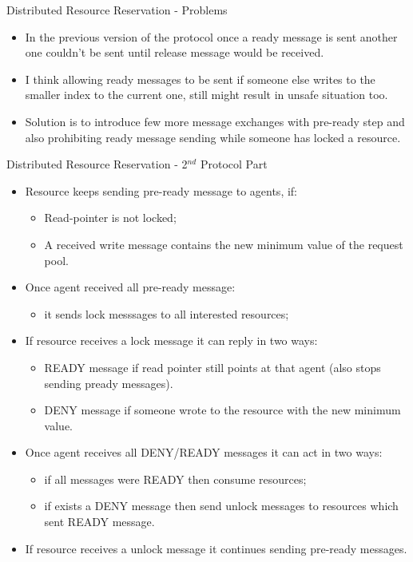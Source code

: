 \documentclass[10pt]{beamer}
\begin{document}
\begin{frame}{Distributed Resource Reservation - Problems}
	\begin{itemize}
		\item In the previous version of the protocol once a ready message is sent another one couldn't be sent until release message would be received. 
		\item I think allowing ready messages to be sent if someone else writes to the smaller index to the current one, still might result in unsafe situation too.
		\item Solution is to introduce few more message exchanges with pre-ready step and also prohibiting ready message sending while someone has locked a resource.
	\end{itemize}
	
\end{frame}

\begin{frame}{Distributed Resource Reservation - 2$^{nd}$ Protocol Part}

\small

	\begin{itemize}
		\item Resource keeps sending pre-ready message to agents, if:
			\begin{itemize}
				\item Read-pointer is not locked;
				\item A received write message contains the new minimum value of the request pool.
			\end{itemize}
			\item Once agent received all pre-ready message:
				\begin{itemize}
					\item it sends lock messsages to all interested resources;
				\end{itemize}
			\item If resource receives a lock message it can reply in two ways:
			\begin{itemize}
				\item READY message if read pointer still points at that agent (also stops sending pready messages).
				\item DENY message if someone wrote to the resource with the new minimum value.
			\end{itemize}
			\item Once agent receives all DENY/READY messages it can act in two ways:
			\begin{itemize}
				\item if all messages were READY then consume resources;
				\item if exists a DENY message then send unlock messages to resources which sent READY message.
			\end{itemize}
			\item If resource receives a unlock message it continues sending pre-ready messages.
	\end{itemize}
		

\end{frame}
\end{document}

